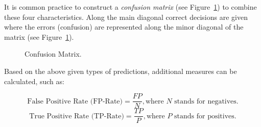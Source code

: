 It is common practice to construct a \textit{confusion matrix} (see Figure~\ref{fig:confusion-matrix}) to combine these four characteristics. Along the main diagonal correct decisions are given where the errors (confusion) are represented along the minor diagonal of the matrix (see Figure~\ref{fig:confusion-matrix}).

\begin{figure}[h!]
    \centering
    \caption{Confusion Matrix.}
    \label{fig:confusion-matrix}
\end{figure}

Based on the above given types of predictions, additional measures can be calculated, such as:

\[ \textrm{False Positive Rate (FP-Rate)} = \frac{FP}{N}, \textrm{where } N \textrm{ stands for negatives.}  \]
\[ \textrm{True Positive Rate (TP-Rate)} = \frac{TP}{P}, \textrm{where } P \textrm{ stands for positives.}  \]


